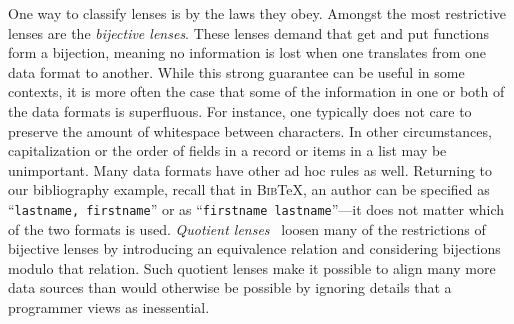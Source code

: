 \documentclass[acmsmall,review,anonymous]{acmart}
\newcommand{\bibtex}{\textsc{Bib}\TeX{}}
\newcommand{\cd}[1]{\lstinline[backgroundcolor=\color{white}]$#1$}
\begin{document}
One way to classify lenses is by the laws they obey.  Amongst the most
restrictive lenses are the \emph{bijective lenses}.  These lenses demand
that get and put functions form a bijection, meaning no information
is lost when one translates from one data format to another.  While this
strong guarantee can be useful in some contexts, it is more often the case
that some of the information in one or both of the data formats is superfluous.
For instance, one typically does not care to preserve the amount of
whitespace between characters.  In other circumstances, capitalization
or the order of fields in a record or items in a list may be unimportant.
%
Many data formats have other ad hoc rules as well.
Returning to our bibliography example, recall that in \bibtex{},
an author can be specified as
``\cd{lastname, firstname}'' or as ``\cd{firstname lastname}''---it does not matter which of the
two formats is used.
%
{\em Quotient lenses}~\cite{quotientlenses} loosen many of the restrictions
of bijective lenses by introducing an equivalence relation and considering
bijections modulo that relation.  Such quotient lenses make it possible
to align many more data sources than would otherwise be possible by
ignoring details that a programmer views as inessential.
\end{document}
